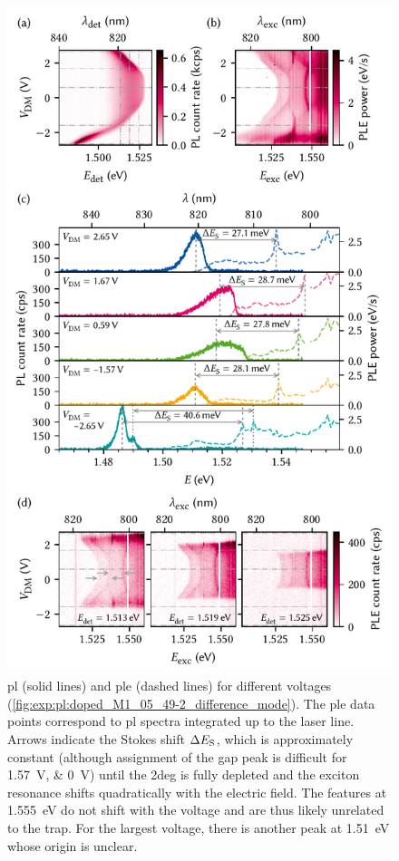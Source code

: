 \begin{figure}
    \centering
    \includegraphics{img/pdf/experiment/doped_M1_05_49-2_ple}
    \caption[
        ,
        .
        \protect\newline
    ]{
        \Gls{pl} (solid lines) and \gls{ple} (dashed lines) for different voltages \VDM (\cf \cref{fig:exp:pl:doped_M1_05_49-2_difference_mode}).
        The \gls{ple} data points correspond to \gls{pl} spectra integrated up to the laser line.
        Arrows indicate the Stokes shift $\Delta E_{\mathrm{S}}$, which is approximately constant (although assignment of the gap peak is difficult for \qtylist{1.57;0}{\volt}) until the \gls{2deg} is fully depleted and the exciton resonance shifts quadratically with the electric field.
        The features at \qty{1.555}{\electronvolt} do not shift with the voltage and are thus likely unrelated to the trap.
        For the largest voltage, there is another peak at \qty{1.51}{\electronvolt} whose origin is unclear.
    }
    \label{fig:exp:pl:doped_M1_05_49-2_ple}
\end{figure}

